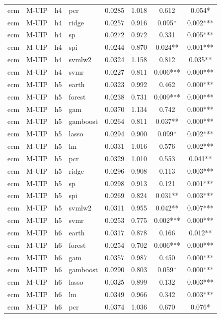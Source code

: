 \begin{ThreePartTable}
\begin{longtable}[t]{llclcccc}
ecm & M-UIP & h4 & pcr & 0.0285 & 1.018 & 0.612 & 0.054*\\
ecm & M-UIP & h4 & ridge & 0.0257 & 0.916 & 0.095* & 0.002***\\
ecm & M-UIP & h4 & sp & 0.0272 & 0.972 & 0.331 & 0.005***\\
ecm & M-UIP & h4 & spi & 0.0244 & 0.870 & 0.024** & 0.001***\\
ecm & M-UIP & h4 & svmlw2 & 0.0324 & 1.158 & 0.812 & 0.035**\\
ecm & M-UIP & h4 & svmr & 0.0227 & 0.811 & 0.006*** & 0.000***\\
\addlinespace
ecm & M-UIP & h5 & earth & 0.0323 & 0.992 & 0.462 & 0.000***\\
ecm & M-UIP & h5 & forest & 0.0238 & 0.731 & 0.009*** & 0.000***\\
ecm & M-UIP & h5 & gam & 0.0370 & 1.134 & 0.742 & 0.000***\\
ecm & M-UIP & h5 & gamboost & 0.0264 & 0.811 & 0.037** & 0.000***\\
ecm & M-UIP & h5 & lasso & 0.0294 & 0.900 & 0.099* & 0.002***\\
ecm & M-UIP & h5 & lm & 0.0331 & 1.016 & 0.576 & 0.002***\\
ecm & M-UIP & h5 & pcr & 0.0329 & 1.010 & 0.553 & 0.041**\\
ecm & M-UIP & h5 & ridge & 0.0296 & 0.908 & 0.113 & 0.003***\\
ecm & M-UIP & h5 & sp & 0.0298 & 0.913 & 0.121 & 0.001***\\
ecm & M-UIP & h5 & spi & 0.0269 & 0.824 & 0.031** & 0.003***\\
ecm & M-UIP & h5 & svmlw2 & 0.0311 & 0.955 & 0.042** & 0.007***\\
ecm & M-UIP & h5 & svmr & 0.0253 & 0.775 & 0.002*** & 0.000***\\
\addlinespace
ecm & M-UIP & h6 & earth & 0.0317 & 0.878 & 0.166 & 0.012**\\
ecm & M-UIP & h6 & forest & 0.0254 & 0.702 & 0.006*** & 0.000***\\
ecm & M-UIP & h6 & gam & 0.0357 & 0.987 & 0.450 & 0.000***\\
ecm & M-UIP & h6 & gamboost & 0.0290 & 0.803 & 0.059* & 0.000***\\
ecm & M-UIP & h6 & lasso & 0.0325 & 0.899 & 0.132 & 0.003***\\
ecm & M-UIP & h6 & lm & 0.0349 & 0.966 & 0.342 & 0.003***\\
ecm & M-UIP & h6 & pcr & 0.0374 & 1.036 & 0.670 & 0.076*\\

\end{longtable}
\end{ThreePartTable}
